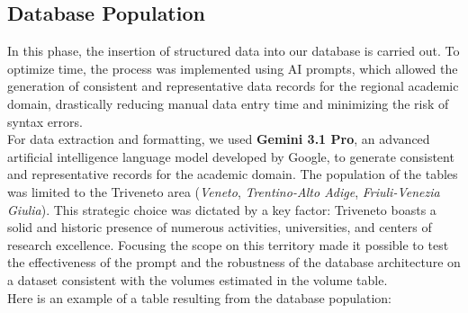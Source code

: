\documentclass[a4paper,12pt]{article}
\begin{document}
\subsection{Database Population} \label{subsec:popolamento}
In this phase, the insertion of structured data into our database is carried out. To optimize time, the process was implemented using AI prompts, which allowed the generation of consistent and representative data records for the regional academic domain, drastically reducing manual data entry time and minimizing the risk of syntax errors.
\\For data extraction and formatting, we used \textbf{Gemini 3.1 Pro}, an advanced artificial intelligence language model developed by Google, to generate consistent and representative records for the academic domain.
The population of the tables was limited to the Triveneto area (\textit{Veneto}, \textit{Trentino-Alto Adige}, \textit{Friuli-Venezia Giulia}).
This strategic choice was dictated by a key factor: Triveneto boasts a solid and historic presence of numerous activities, universities, and centers of research excellence.
Focusing the scope on this territory made it possible to test the effectiveness of the prompt and the robustness of the database architecture on a dataset consistent with the volumes estimated in the volume table.
\\ Here is an example of a table resulting from the database population:
\end{document}
